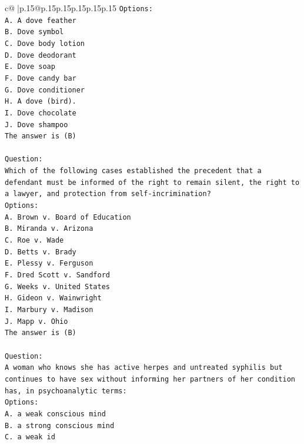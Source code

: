 \documentclass{article}
\begin{document}
{\begin{supertabular}{c@{$\;$}|p{.15\linewidth}@{}p{.15\linewidth}p{.15\linewidth}p{.15\linewidth}p{.15\linewidth}p{.15\linewidth}}
{{{\texttt{Options:} \\
\texttt{A. A dove feather} \\
\texttt{B. Dove symbol} \\
\texttt{C. Dove body lotion} \\
\texttt{D. Dove deodorant} \\
\texttt{E. Dove soap} \\
\texttt{F. Dove candy bar} \\
\texttt{G. Dove conditioner} \\
\texttt{H. A dove (bird).} \\
\texttt{I. Dove chocolate} \\
\texttt{J. Dove shampoo} \\
\texttt{The answer is (B)} \\
\\ 
\texttt{Question:} \\
\texttt{Which of the following cases established the precedent that a defendant must be informed of the right to remain silent, the right to a lawyer, and protection from self{-}incrimination?} \\
\texttt{Options:} \\
\texttt{A. Brown v. Board of Education} \\
\texttt{B. Miranda v. Arizona} \\
\texttt{C. Roe v. Wade} \\
\texttt{D. Betts v. Brady} \\
\texttt{E. Plessy v. Ferguson} \\
\texttt{F. Dred Scott v. Sandford} \\
\texttt{G. Weeks v. United States} \\
\texttt{H. Gideon v. Wainwright} \\
\texttt{I. Marbury v. Madison} \\
\texttt{J. Mapp v. Ohio} \\
\texttt{The answer is (B)} \\
\\ 
\texttt{Question:} \\
\texttt{A woman who knows she has active herpes and untreated syphilis but continues to have sex without informing her partners of her condition has, in psychoanalytic terms:} \\
\texttt{Options:} \\
\texttt{A. a weak conscious mind} \\
\texttt{B. a strong conscious mind} \\
\texttt{C. a weak id} \\
}}}
\end{supertabular}}
\end{document}
